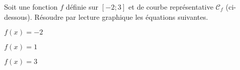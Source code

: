 
\exo{} 
Soit une fonction $f$ définie sur $[-2;3]$ et de courbe représentative $\mathcal{C}_f$ (ci-dessous).
Résoudre par lecture graphique les équations suivantes. 

\question{}
$f(x) = -2$


\question{}
$f(x) = 1$


\question{}
$f(x) = 3$



\begin{center}
\end{center}
